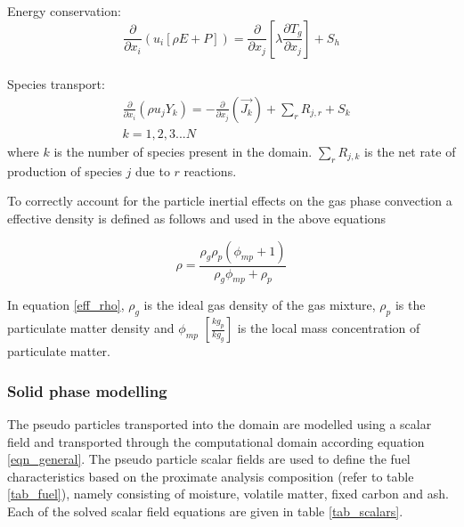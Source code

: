 \documentclass{webofc}
\begin{document}
\\
\\
Energy conservation:
\begin{equation}\label{eqn_energy}
\frac{\partial }{\partial x_{i}} (u_{i}[\rho E+P])=\frac{\partial }{\partial x_{j}}\left[\lambda\frac{\partial T_{g}}{\partial x_{j}}\right] +S_{h}
\end{equation}
\\
Species transport:
\begin{equation}\label{eqn_species}
\begin{split}
&\frac{\partial}{\partial x_{i}}(\rho u_{j}Y_{k})=-\frac{\partial}{\partial x_{j}}(\vec{J_{k}})+ \sum_r R_{j,r} + S_{k}\\
&k = 1,2,3...N
\end{split}
\end{equation}
where $k$ is the number of species present in the domain. $\sum_r R_{j,k}$ is the net rate of production of species $j$ due to $r$ reactions.

 To correctly account for the particle inertial effects on the gas phase convection a effective density is defined as follows and used in the above equations

\begin{equation} \label{eff_rho}
	\rho = \frac{\rho_{g} \rho_p \left( \phi_{mp} + 1 \right)}{\rho_g \phi_{mp} + \rho_p}
\end{equation}

In equation \eqref{eff_rho}, $\rho_g$ is the ideal gas density of the gas mixture, $\rho_p$ is the particulate matter density and $\phi_{mp}$ $[\frac{kg_p}{kg_g}]$ is the local mass concentration of particulate matter. 

\subsubsection{Solid phase modelling}
The pseudo particles transported into the domain are modelled using a scalar field and transported through the computational domain according equation \ref{eqn_general}. The pseudo particle scalar fields are used to define the fuel characteristics based on the proximate analysis composition (refer to table \ref{tab_fuel}), namely consisting of moisture, volatile matter, fixed  carbon and ash. Each of the solved scalar field equations are given in table \ref{tab_scalars}.\\
\end{document}
